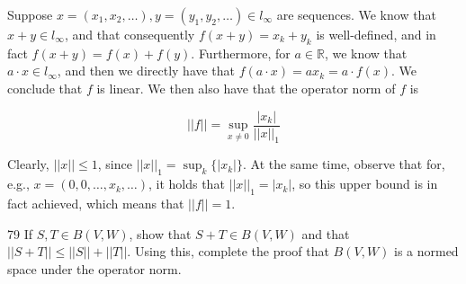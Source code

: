 \begin{solution}
    
    Suppose $x = (x_1, x_2, \ldots), y = (y_1, y_2, \ldots) \in l_{\infty}$ are sequences.
    We know that $x + y \in l_{\infty}$, and that consequently $f(x + y) = x_k + y_k$ is well-defined, and in fact $f(x + y) = f(x) + f(y)$.
    Furthermore, for $a \in \mathbb{R}$, we know that $a \cdot x \in l_{\infty}$, and then we directly have that $f(a \cdot x) = a x_k = a \cdot f(x)$.
    We conclude that $f$ is linear.
    We then also have that the operator norm of $f$ is

    \[\lvert \lvert f \rvert \rvert = \sup_{x \neq 0} \frac{\lvert x_k \rvert}{\lvert \lvert x \rvert \rvert_1}\]

    Clearly, $\lvert \lvert x \rvert \rvert \leq 1$, since $\lvert \lvert x \rvert \rvert_1 = \sup_{k}\{\lvert x_k \rvert\}$.
    At the same time, observe that for, e.g., $x = (0, 0, \ldots, x_k, \ldots)$, it holds that $\lvert \lvert x \rvert \rvert_1 = \lvert x_k \rvert$, so this upper bound is in fact achieved, which means that $\lvert \lvert f \rvert \rvert = 1$.
\end{solution}

\begin{exercise}{79}
    If $S, T \in B(V, W)$, show that $S + T \in B(V, W)$ and that $\lvert \lvert S + T \rvert \rvert \leq \lvert \lvert S \rvert \rvert + \lvert \lvert T \rvert \rvert$.
    Using this, complete the proof that $B(V, W)$ is a normed space under the operator norm.
\end{exercise}

